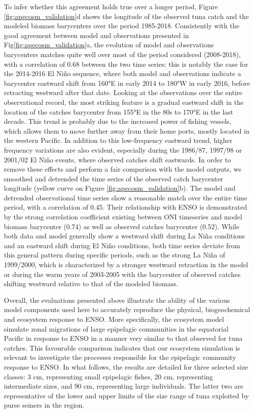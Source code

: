 To infer whether this agreement holds true over a longer period, Figure \ref{fig:apecosm_validation}d shows the longitude of the observed tuna catch and the modeled biomass barycenters over the period 1985-2018. Consistently with the good agreement between model and observations presented in Fig\ref{fig:apecosm_validation}a, the evolution of model and observations barycenters matches quite well over most of the period considered (2008-2018), with a correlation of 0.68 between the two time series: this is notably the case for the 2014-2016 El Niño sequence, where both model and observations indicate a barycenter eastward shift from 160°E in early 2014 to 180°W in early 2016, before retracting westward after that date. Looking at the observations over the entire observational record, the most striking feature is a gradual eastward shift in the location of the catches barycenter from 155°E in the 80s to 170°E in the last decade. This trend is probably due to the increased power of fishing vessels, which allows them to move further away from their home ports, mostly located in the western Pacific. In addition to this low-frequency eastward trend, higher frequency variations are also evident, especially during the 1986/87, 1997/98 or 2001/02 El Niño events, where observed catches shift eastwards. In order to remove these effects and perform a fair comparison with the model outputs, we smoothed and detrended the time series of the observed catch barycenter longitude (yellow curve on Figure \ref{fig:apecosm_validation}b). The model and detrended observational time series show a reasonable match over the entire time period, with a correlation of 0.45. Their relationship with ENSO is demonstrated by the strong correlation coefficient existing between ONI timeseries and model biomass barycenter (0.74) as well as observed catches barycenter (0.52). While both data and model generally show a westward shift during La Niña conditions and an eastward shift during El Niño conditions, both time series deviate from this general pattern during specific periods, such as the strong La Niña of 1999/2000, which is characterized by a stronger westward retraction in the model or during the warm years of 2003-2005 with the barycenter of observed catches shifting westward relative to that of the modeled biomass.

Overall, the evaluations presented above illustrate the ability of the various model components used here to accurately reproduce the physical, biogeochemical and ecosystem response to ENSO. More specifically, the ecosystem model simulate zonal migrations of large epipelagic communities in the equatorial Pacific in response to ENSO in a manner very similar to that observed for tuna catches. This favourable comparison indicates that our ecosystem simulation is relevant to investigate the processes responsible for the epipelagic community response to ENSO. In what follows, the results are detailed for three selected size classes: 3 cm, representing small epipelagic fishes, 20 cm, representing intermediate sizes, and 90 cm, representing large individuals. The latter two are representative of the lower and upper limits of the size range of tuna exploited by purse seiners in the region.

\clearpage